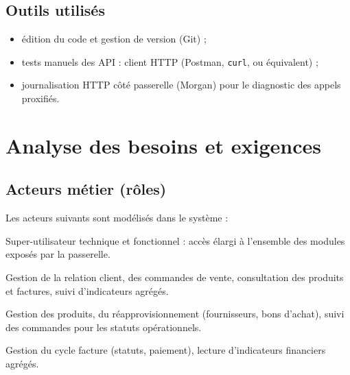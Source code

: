 \documentclass[11pt,a4paper]{article}
\begin{document}
\subsection{Outils utilisés}
\begin{itemize}[noitemsep]
  \item édition du code et gestion de version (Git) ;
  \item tests manuels des API : client HTTP (Postman, \texttt{curl}, ou équivalent) ;
  \item journalisation HTTP côté passerelle (Morgan) pour le diagnostic des appels proxifiés.
\end{itemize}

\section{Analyse des besoins et exigences}

\subsection{Acteurs métier (rôles)}
Les acteurs suivants sont modélisés dans le système :
\begin{description}[style=nextline]
  \item[Administrateur (\texttt{admin})] Super-utilisateur technique et fonctionnel : accès élargi à l'ensemble des modules exposés par la passerelle.
  \item[Commercial (\texttt{sales})] Gestion de la relation client, des commandes de vente, consultation des produits et factures, suivi d'indicateurs agrégés.
  \item[Inventaire / logistique (\texttt{inventory})] Gestion des produits, du réapprovisionnement (fournisseurs, bons d'achat), suivi des commandes pour les statuts opérationnels.
  \item[Comptabilité (\texttt{accounting})] Gestion du cycle facture (statuts, paiement), lecture d'indicateurs financiers agrégés.
\end{description}
\end{document}
